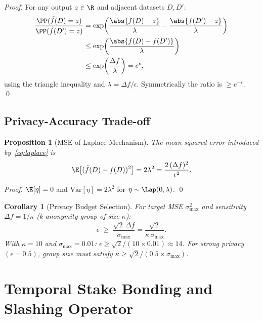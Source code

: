 \documentclass[12pt,a4paper]{article}
\newtheorem{proposition}[theorem]{Proposition}
\newtheorem{corollary}[theorem]{Corollary}
\theoremstyle{definition}
\theoremstyle{remark}
\begin{document}
\begin{proof}
For any output $z\in\R$ and adjacent datasets $D,D'$:
\begin{align*}
  \frac{\PP(\tilde f(D)=z)}{\PP(\tilde f(D')=z)}
  &= \exp\!\left(\frac{\abs{f(D)-z}}{\lambda} - \frac{\abs{f(D')-z}}{\lambda}\right) \\
  &\le \exp\!\left(\frac{\abs{f(D)-f(D')}}{\lambda}\right) \\
  &\le \exp\!\left(\frac{\Delta f}{\lambda}\right) = e^\epsilon,
\end{align*}
using the triangle inequality and $\lambda = \Delta f/\epsilon$.
Symmetrically the ratio is $\ge e^{-\epsilon}$. \qed
\end{proof}

\subsection{Privacy-Accuracy Trade-off}

\begin{proposition}[MSE of Laplace Mechanism]
The mean squared error introduced by~\eqref{eq:laplace} is
\begin{equation}
  \E\!\left[(\tilde f(D) - f(D))^2\right]
  = 2\lambda^2 = \frac{2\,(\Delta f)^2}{\epsilon^2}.
  \label{eq:mse}
\end{equation}
\end{proposition}

\begin{proof}
$\E[\eta]=0$ and $\mathrm{Var}[\eta]=2\lambda^2$ for $\eta\sim\Lap(0,\lambda)$. \qed
\end{proof}

\begin{corollary}[Privacy Budget Selection]
\label{cor:eps}
For target MSE $\sigma_{\max}^2$ and sensitivity $\Delta f = 1/\kappa$ (k-anonymity
group of size $\kappa$):
\begin{equation}
  \epsilon \;\ge\; \frac{\sqrt{2}\,\Delta f}{\sigma_{\max}}
              = \frac{\sqrt{2}}{\kappa\,\sigma_{\max}}.
\end{equation}
With $\kappa=10$ and $\sigma_{\max}=0.01$: $\epsilon \ge \sqrt{2}/(10\times0.01) \approx 14$.
For strong privacy $(\epsilon=0.5)$, group size must satisfy $\kappa \ge \sqrt{2}/(0.5\times\sigma_{\max})$.
\end{corollary}

\section{Temporal Stake Bonding and Slashing Operator}
\label{sec:slashing}
\end{document}
